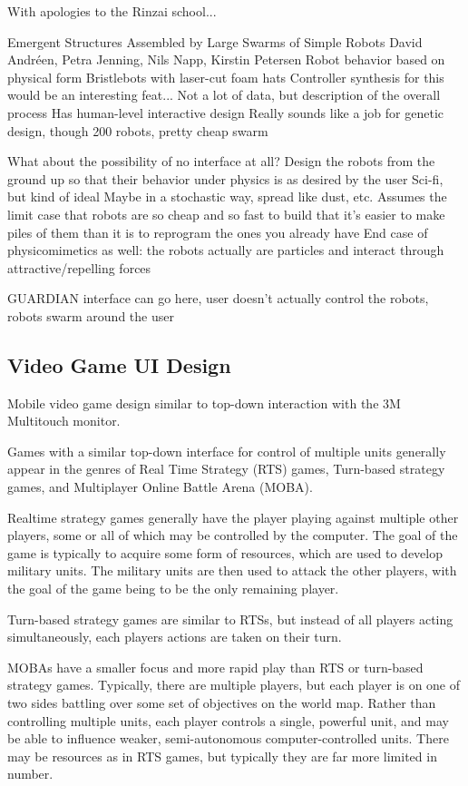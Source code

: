 With apologies to the Rinzai school...

Emergent Structures Assembled by Large Swarms of Simple Robots 
David Andréen, Petra Jenning, Nils Napp, Kirstin Petersen
	Robot behavior based on physical form
	Bristlebots with laser-cut foam hats
		Controller synthesis for this would be an interesting feat...
	Not a lot of data, but description of the overall process
		Has human-level interactive design
			Really sounds like a job for genetic design, though
	200 robots, pretty cheap swarm


What about the possibility of no interface at all?
	Design the robots from the ground up so that their behavior under physics is as desired by the user
	Sci-fi, but kind of ideal
	Maybe in a stochastic way, spread like dust, etc. 
	Assumes the limit case that robots are so cheap and so fast to build that it's easier to make piles of them than it is to reprogram the ones you already have
	End case of physicomimetics as well: the robots actually are particles and interact through attractive/repelling forces

GUARDIAN interface can go here, user doesn't actually control the robots, robots swarm around the user


\subsection{Video Game UI Design}

Mobile video game design similar to top-down interaction with the 3M Multitouch monitor. 


Games with a similar top-down interface for control of multiple units generally appear in the genres of Real Time Strategy (RTS) games, Turn-based strategy games, and Multiplayer Online Battle Arena (MOBA). 

Realtime strategy games generally have the player playing against multiple other players, some or all of which may be controlled by the computer. The goal of the game is typically to acquire some form of resources, which are used to develop military units. The military units are then used to attack the other players, with the goal of the game being to be the only remaining player. 

Turn-based strategy games are similar to RTSs, but instead of all players acting simultaneously, each players actions are taken on their turn. 

MOBAs have a smaller focus and more rapid play than RTS or turn-based strategy games. Typically, there are multiple players, but each player is on one of two sides battling over some set of objectives on the world map. Rather than controlling multiple units, each player controls a single, powerful unit, and may be able to influence weaker, semi-autonomous computer-controlled units.  There may be resources as in RTS games, but typically they are far more limited in number.   


